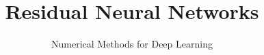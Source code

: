 \documentclass[12pt,fleqn,handout]{beamer}
\date{}
\title[ResNet]{Residual Neural Networks}
\subtitle{Numerical Methods for Deep Learning}
\begin{document}
\makebeamertitle
\end{document}
